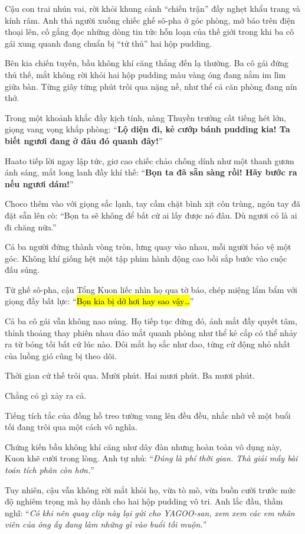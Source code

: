 \documentclass[../main.tex]{subfiles}
\begin{document}
Cậu con trai nhún vai, rời khỏi khung cảnh ``chiến trận'' đầy nghẹt khẩu trang và kính râm. Anh thả người xuống chiếc ghế sô-pha ở góc phòng, mở báo trên điện thoại lên, cố gắng đọc những dòng tin tức hỗn loạn của thế giới trong khi ba cô gái xung quanh đang chuẩn bị ``tử thủ'' hai hộp pudding.

\ct

Bên kia chiến tuyến, bầu không khí căng thẳng đến lạ thường. Ba cô gái đứng thủ thế, mắt không rời khỏi hai hộp pudding màu vàng óng đang nằm im lìm giữa bàn. Từng giây từng phút trôi qua nặng nề, như thể cả căn phòng đang nín thở.

Trong một khoảnh khắc đầy kịch tính, nàng Thuyền trưởng cất tiếng hét lớn, giọng vang vọng khắp phòng: ``\textbf{Lộ diện đi, kẻ cướp bánh pudding kia! Ta biết ngươi đang ở đâu đó quanh đây!}''

Haato tiếp lời ngay lập tức, giơ cao chiếc chảo chống dính như một thanh gươm ánh sáng, mắt long lanh đầy khí thế: ``\textbf{Bọn ta đã sẵn sàng rồi! Hãy bước ra nếu ngươi dám!}''

Choco thêm vào với giọng sắc lạnh, tay cầm chặt bình xịt côn trùng, ngón tay đã đặt sẵn lên cò: ``Bọn ta sẽ không để bất cứ ai lấy được nó đâu. Dù ngươi có là ai đi chăng nữa.''

Cả ba người đứng thành vòng tròn, lưng quay vào nhau, mỗi người bảo vệ một góc. Không khí giống hệt một tập phim hành động cao bồi sắp bước vào cuộc đấu súng.

Từ ghế sô-pha, cậu Tổng Kuon liếc nhìn họ qua tờ báo, chép miệng lẩm bẩm với giọng đầy bất lực: ``\hl{Bọn kia bị dở hơi hay sao vậy\dots}''

Cả ba cô gái vẫn không nao núng. Họ tiếp tục đứng đó, ánh mắt đầy quyết tâm, thỉnh thoảng thay phiên nhau đảo mắt quanh phòng như thể kẻ cắp có thể nhảy ra từ bóng tối bất cứ lúc nào. Đôi mắt họ sắc như dao, từng cử động nhỏ nhất của luồng gió cũng bị theo dõi.

Thời gian cứ thế trôi qua. Mười phút. Hai mươi phút. Ba mươi phút.

Chẳng có gì xảy ra cả.

Tiếng tích tắc của đồng hồ treo tường vang lên đều đều, nhắc nhở về một buổi tối đang trôi qua một cách vô nghĩa.

Chứng kiến bầu không khí căng như dây đàn nhưng hoàn toàn vô dụng này, Kuon khẽ cười trong lòng. Anh tự nhủ: ``\textit{Đúng là phí thời gian. Thà giải mấy bài toán tích phân còn hơn.}''

Tuy nhiên, cậu vẫn không rời mắt khỏi họ, vừa tò mò, vừa buồn cười trước mức độ nghiêm trọng mà họ dành cho hai hộp pudding vô tri. Anh lắc đầu, thầm nghĩ: ``\textit{Có khi nên quay clip này lại gửi cho YAGOO-san, xem xem các em nhân viên của ông ấy đang làm những gì vào buổi tối muộn.}''
\end{document}
